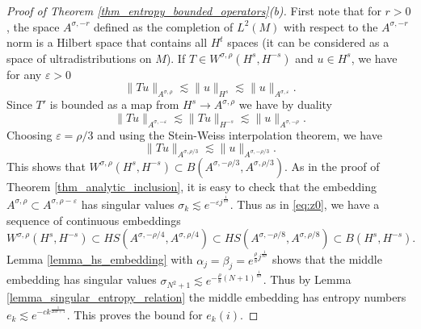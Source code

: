 \documentclass[12pt,twoside]{amsart}
\numberwithin{equation}{section}
\newcommand{\norm}[1]{\lVert #1 \rVert}         %
\newcommand{\eps}{\varepsilon}
\begin{document}
\begin{proof}[Proof of Theorem \ref{thm_entropy_bounded_operators}(b)]
First note that for $r > 0$, the space $A^{\sigma,-r}$ defined as the completion of $L^2(M)$ with respect to the $A^{\sigma,-r}$ norm is a Hilbert space that contains all $H^t$ spaces (it can be considered as a space of ultradistributions on $M$). If $T \in W^{\sigma,\rho}(H^s, H^{-s})$ and $u \in H^s$, we have for any $\eps > 0$ 
\[
\norm{Tu}_{A^{\sigma,\rho}} \lesssim \norm{u}_{H^s} \lesssim \norm{u}_{A^{\sigma,\eps}}.
\]
Since $T'$ is bounded as a map from $H^s \to A^{\sigma,\rho}$ we have by duality 
\[
\norm{Tu}_{A^{\sigma,-\eps}} \lesssim \norm{Tu}_{H^{-s}} \lesssim \norm{u}_{A^{\sigma,-\rho}}.
\]
Choosing $\eps = \rho/3$ and using the Stein-Weiss interpolation theorem, we have 
\[
\norm{Tu}_{A^{\sigma,\rho/3}} \lesssim \norm{u}_{A^{\sigma,-\rho/3}}.
\]
This shows that $W^{\sigma,\rho}(H^s, H^{-s}) \subset B(A^{\sigma,-\rho/3}, A^{\sigma,\rho/3})$. As in the proof of Theorem \ref{thm_analytic_inclusion}, it is easy to check that the embedding $A^{\sigma,\rho} \subset A^{\sigma,\rho-\eps}$ has singular values $\sigma_k \lesssim e^{-\eps j^{\frac{1}{n\sigma}}}$.
Thus as in \eqref{eq:z0}, we have a sequence of continuous embeddings 
\begin{equation} \label{w_embeddings}
W^{\sigma,\rho}(H^s, H^{-s}) \subset HS(A^{\sigma,-\rho/4}, A^{\sigma,\rho/4}) \subset HS(A^{\sigma,-\rho/8}, A^{\sigma,\rho/8}) \subset B(H^s, H^{-s}).
\end{equation}
Lemma \ref{lemma_hs_embedding} with $\alpha_j = \beta_j = e^{\frac{\rho}{8} j^{\frac{1}{n\sigma}}}$ shows that the middle embedding has singular values $\sigma_{N^2+1} \lesssim e^{-\frac{\rho}{8} (N+1)^{\frac{1}{n\sigma}}}$. Thus by Lemma \ref{lemma_singular_entropy_relation} the middle embedding has entropy numbers $e_k \lesssim e^{-c k^{\frac{1}{2n\sigma+1}}}$. This proves the bound for $e_k(i)$.
\end{proof}
\end{document}
